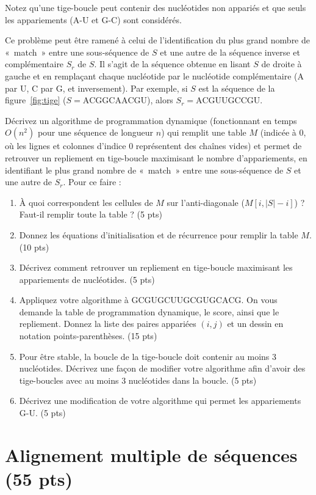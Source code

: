 \documentclass[12pt]{article}
\begin{document}
Notez qu'une tige-boucle peut contenir des nucléotides non appariés et que seuls les appariements (A-U et G-C) sont considérés.

Ce problème peut être ramené à celui de l'identification du plus grand nombre de «~match~» entre une sous-séquence de $S$ et une autre de la séquence inverse et complémentaire $S_r$ de $S$. Il s'agit de la séquence obtenue en lisant $S$ de droite à gauche et en remplaçant chaque nucléotide par le nucléotide complémentaire (A par U, C par G, et inversement).
Par exemple, si $S$ est la séquence de la figure~\ref{fig:tige} ($S = \mathrm{ACGGCAACGU}$), alors $S_r = \mathrm{ACGUUGCCGU}$.

Décrivez un algorithme de programmation dynamique (fonctionnant en temps $O(n^2)$ pour une séquence de longueur $n$) qui remplit une table $M$ (indicée à 0, où les lignes et colonnes d'indice 0 représentent des chaînes vides) et permet de retrouver un repliement en tige-boucle maximisant le nombre d'appariements, en identifiant le plus grand nombre de «~match~» entre une sous-séquence de $S$ et une autre de $S_r$. Pour ce faire :
\begin{enumerate}
	\item À quoi correspondent les cellules de $M$ sur l'anti-diagonale ($M[i, |S|-i]$) ? Faut-il remplir toute la table ? (5 pts)
	\item Donnez les équations d'initialisation et de récurrence pour remplir la table $M$. (10 pts)
	\item Décrivez comment retrouver un repliement en tige-boucle maximisant les appariements de nucléotides. (5 pts)
	\item Appliquez votre algorithme à $\mathrm{GCGUGCUUGCGUGCACG}$. On vous demande la table de programmation dynamique, le score, ainsi que le repliement. Donnez la liste des paires appariées $(i, j)$ et un dessin en notation points-parenthèses. (15 pts)
	\item Pour être stable, la boucle de la tige-boucle doit contenir au moins 3 nucléotides. Décrivez une façon de modifier votre algorithme afin d'avoir des tige-boucles avec au moins 3 nucléotides dans la boucle. (5 pts)
	\item Décrivez une modification de votre algorithme qui permet les appariements G-U. (5 pts)
\end{enumerate}

\section*{Alignement multiple de séquences (55 pts)}
\end{document}
